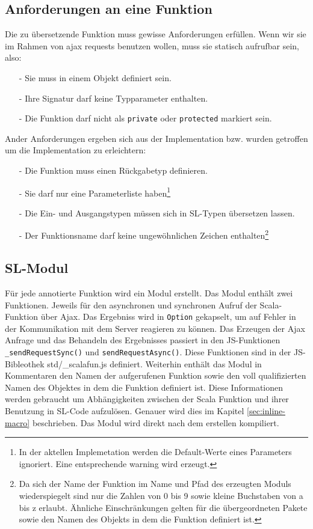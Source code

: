 \documentclass[12pt]{scrreprt}
\begin{document}
\subsection{Anforderungen an eine Funktion}

Die zu übersetzende Funktion muss gewisse Anforderungen erfüllen. Wenn wir sie im Rahmen von ajax requests benutzen wollen, muss sie statisch aufrufbar sein, also:
\begin{itemize}
  \item[-]{Sie muss in einem Objekt definiert sein.}
  \item[-]{Ihre Signatur darf keine Typparameter enthalten.}
  \item[-]{Die Funktion darf nicht als \lstinline!private! oder \lstinline!protected! markiert sein.}
 \end{itemize}

Ander Anforderungen ergeben sich aus der Implementation bzw. wurden getroffen um die Implementation zu erleichtern:
\begin{itemize}
 \item[-]{Die Funktion muss einen Rückgabetyp definieren.}
 \item[-]{Sie darf nur eine Parameterliste haben\footnote{In der aktellen Implemetation werden die Default-Werte eines Parameters ignoriert. Eine entsprechende warning wird erzeugt.}}
 \item[-]{Die Ein- und Ausgangstypen müssen sich in \ac{SL}-Typen übersetzen lassen.}
 \item[-]{Der Funktionsname darf keine ungewöhnlichen Zeichen enthalten\footnote{Da sich der Name der Funktion im Name und Pfad des erzeugten Moduls wiederspiegelt sind nur die Zahlen von 0 bis 9 sowie kleine Buchstaben von a bis z erlaubt. Ähnliche Einschränkungen gelten für die übergeordneten Pakete sowie den Namen des Objekts in dem die Funktion definiert ist.}}
\end{itemize}

\subsection{SL-Modul}
\label{subsec:sl-modul}

Für jede annotierte Funktion wird ein Modul erstellt. Das Modul enthält zwei Funktionen. Jeweils für den asynchronen und synchronen Aufruf der Scala-Funktion über Ajax. Das Ergebniss wird in \lstinline!Option! gekapselt, um auf Fehler in der Kommunikation mit dem Server reagieren zu können. Das Erzeugen der Ajax Anfrage und das Behandeln des Ergebnisses passiert in den \ac{JS}-Funktionen \lstinline!_sendRequestSync()! und \lstinline!sendRequestAsync()!. Diese Funktionen sind in der \ac{JS}-Bibleothek std/\_scalafun.js definiert. Weiterhin enthält das Modul in Kommentaren den Namen der aufgerufenen Funktion sowie den voll qualifizierten Namen des Objektes in dem die Funktion definiert ist. Diese Informationen werden gebraucht um Abhängigkeiten zwischen der Scala Funktion und ihrer Benutzung in \ac{SL}-Code aufzulösen. Genauer wird dies im Kapitel \ref{sec:inline-macro} beschrieben. Das Modul wird direkt nach dem erstellen kompiliert.
\end{document}

